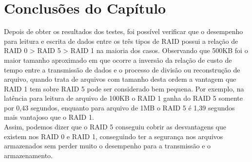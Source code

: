 	\section{Conclusões do Capítulo}
	
	Depois de obter os resultados dos testes, foi possível verificar que o desempenho para leitura e escrita de dados entre os três tipos de RAID possui a relação de RAID 0 > RAID 5 > RAID 1 na maioria dos casos. Observando que 500KB foi o maior tamanho aproximado em que ocorre a inversão da relação de custo de tempo entre a transmissão de dados e o processo de divisão ou reconstrução de arquivo, quando trata de arquivos com tamanho desta ordem a vantagem que RAID 1 tem sobre RAID 5 pode ser considerado bem pequena. 
	Por exemplo, na latência para leitura de arquivo de 100KB o RAID 1 ganha do RAID 5 somente por 0,43 segundos, enquanto para arquivo de 1MB o RAID 5 é 1,39 segundos mais vantajoso que o RAID 1.
	\\
	
	Assim, podemos dizer que o RAID 5 conseguiu cobrir as desvantagens que existem nos RAID 0 e RAID 1, conseguindo ter a segurança nos arquivos armazenados sem perder muito o desempenho para a transmissão e o armazenamento.
	\\
	
	
	
	
	
	
	
	
	
	
	
	
	